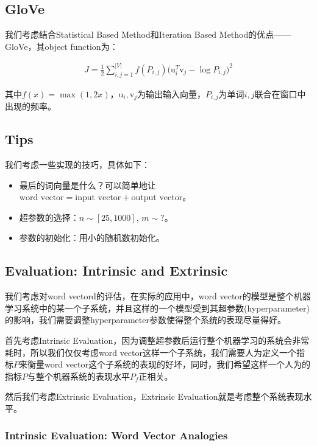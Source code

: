 \documentclass{article}
\begin{document}
\subsection{GloVe}

我们考虑结合Statistical Based Method和Iteration Based Method的优点——GloVe，其object function为：

\begin{eqnarray}
J = \frac{1}{2}\sum_{i,j=1}^{\lvert V\rvert}{f(P_{i,j})\big(\mathrm{u}_i^T\mathrm{v}_j-\log P_{i,j}\big)^2}
\end{eqnarray}

其中$f(x)=\max(1,2x)$，$\mathrm{u}_i,\mathrm{v}_j$为输出输入向量，$P_{i,j}$为单词$i,j$联合在窗口中出现的频率。

\subsection{Tips}

我们考虑一些实现的技巧，具体如下：

\begin{itemize}
	\item 最后的词向量是什么？可以简单地让$\text{word vector} = \text{input vector} + \text{output vector}$。
	\item 超参数的选择：$n \sim [25,1000]$, $m \sim ?$。
	\item 参数的初始化：用小的随机数初始化。
\end{itemize}

\subsection{Evaluation: Intrinsic and Extrinsic}

我们考虑对word vectord的评估，在实际的应用中，word vector的模型是整个机器学习系统中的某一个子系统，并且这样的一个模型受到其超参数(hyperparameter)的影响，我们需要调整hyperparameter参数使得整个系统的表现尽量得好。

首先考虑Intrinsic Evaluation，因为调整超参数后运行整个机器学习的系统会非常耗时，所以我们仅仅考虑word vector这样一个子系统，我们需要人为定义一个指标$P$来衡量word vector这个子系统的表现的好坏，同时，我们希望这样一个人为的指标$P$与整个机器系统的表现水平$P_f$正相关。

然后我们考虑Extrinsic Evaluation，Extrinsic Evaluation就是考虑整个系统表现水平。

\subsubsection*{Intrinsic Evaluation: Word Vector Analogies}
\end{document}

